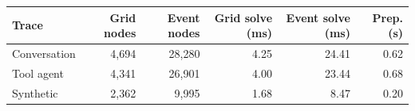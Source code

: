 \begin{tabular}{lrrrrr}
\toprule
Trace & Grid nodes & Event nodes & Grid solve (ms) & Event solve (ms) & Prep. (s)\\
\midrule
Conversation & 4,694 & 28,280 & 4.25 & 24.41 & 0.62\\
Tool agent & 4,341 & 26,901 & 4.00 & 23.44 & 0.68\\
Synthetic & 2,362 & 9,995 & 1.68 & 8.47 & 0.20\\
\bottomrule
\end{tabular}
